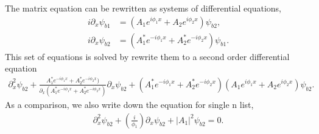 \documentclass[letterpaper,12pt,english]{sphinxmanual}
\begin{document}
The matrix equation can be rewritten as systems of differential equations,
\begin{equation*}
\begin{split}i \partial_x \psi_{b1} &= (A_1 e^{ i \phi_1 x } +A_2 e^{ i \phi_2 x } ) \psi_{b2}, \\
i \partial_x \psi_{b2} & = (A_1^* e^{ - i \phi_1 x } + A_2^* e^{ -i \phi_2 x }) \psi_{b1}.\end{split}
\end{equation*}
This set of equations is solved by rewrite them to a second order differential equation
\label{\detokenize{matter-stimulated/interference:equation-two-n-list-second-order-eq-o-m}}\begin{equation}\label{equation:matter-stimulated/interference:two-n-list-second-order-eq-o-m}
\begin{split}\partial_x^2 \psi_{b2} + \frac{ A_1^* e^{ - i \phi_1 x } + A_2^* e^{ -i \phi_2 x }) }{\partial_x (A_1^* e^{ - i \phi_1 x } + A_2^* e^{ -i \phi_2 x }) } \partial_x \psi_{b2} + (A_1^* e^{ - i \phi_1 x } + A_2^* e^{ -i \phi_2 x }) (A_1 e^{ i \phi_1 x } +A_2 e^{ i \phi_2 x } ) \psi_{b2}.\end{split}
\end{equation}
As a comparison, we also write down the equation for single n list,
\begin{equation*}
\begin{split}\partial_x^2 \psi_{b2} + \left( \frac{i}{\phi_1}  \right) \partial_x \psi_{b2} + \lvert A_1 \rvert^2 \psi_{b2} = 0.\end{split}
\end{equation*}
\end{document}
